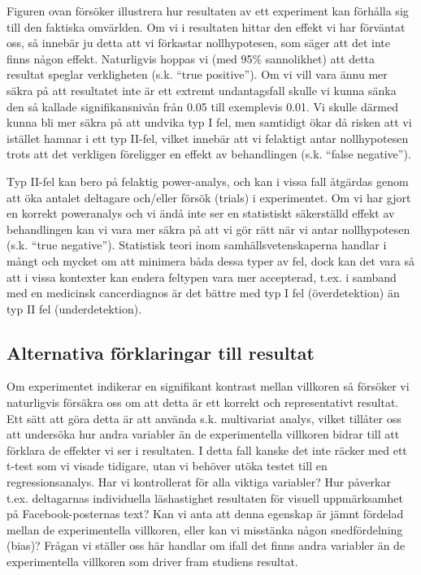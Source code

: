 \documentclass[
]{book}
\begin{document}
Figuren ovan försöker illustrera hur resultaten av ett experiment kan förhålla sig till den faktiska omvärlden. Om vi i resultaten hittar den effekt vi har förväntat oss, så innebär ju detta att vi förkastar nollhypotesen, som säger att det inte finns någon effekt. Naturligvis hoppas vi (med 95\% sannolikhet) att detta resultat speglar verkligheten (s.k. ``true positive''). Om vi vill vara ännu mer säkra på att resultatet inte är ett extremt undantagsfall skulle vi kunna sänka den så kallade signifikansnivån från 0.05 till exemplevis 0.01. Vi skulle därmed kunna bli mer säkra på att undvika typ I fel, men samtidigt ökar då risken att vi istället hamnar i ett typ II-fel, vilket innebär att vi felaktigt antar nollhypotesen trots att det verkligen föreligger en effekt av behandlingen (s.k. ``false negative'').

Typ II-fel kan bero på felaktig power-analys, och kan i vissa fall åtgärdas genom att öka antalet deltagare och/eller försök (trials) i experimentet. Om vi har gjort en korrekt poweranalys och vi ändå inte ser en statistiskt säkerställd effekt av behandlingen kan vi vara mer säkra på att vi gör rätt när vi antar nollhypotesen (s.k. ``true negative''). Statistisk teori inom samhällsvetenskaperna handlar i mångt och mycket om att minimera båda dessa typer av fel, dock kan det vara så att i vissa kontexter kan endera feltypen vara mer accepterad, t.ex. i samband med en medicinsk cancerdiagnos är det bättre med typ I fel (överdetektion) än typ II fel (underdetektion).

\hypertarget{sub08.2.2}{%
\subsection{Alternativa förklaringar till resultat}\label{sub08.2.2}}

Om experimentet indikerar en signifikant kontrast mellan villkoren så försöker vi naturligvis försäkra oss om att detta är ett korrekt och representativt resultat. Ett sätt att göra detta är att använda s.k. multivariat analys, vilket tillåter oss att undersöka hur andra variabler än de experimentella villkoren bidrar till att förklara de effekter vi ser i resultaten. I detta fall kanske det inte räcker med ett t-test som vi visade tidigare, utan vi behöver utöka testet till en regressionsanalys. Har vi kontrollerat för alla viktiga variabler? Hur påverkar t.ex. deltagarnas individuella läshastighet resultaten för visuell uppmärksamhet på Facebook-posternas text? Kan vi anta att denna egenskap är jämnt fördelad mellan de experimentella villkoren, eller kan vi misstänka någon snedfördelning (bias)? Frågan vi ställer oss här handlar om ifall det finns andra variabler än de experimentella villkoren som driver fram studiens resultat.
\end{document}
